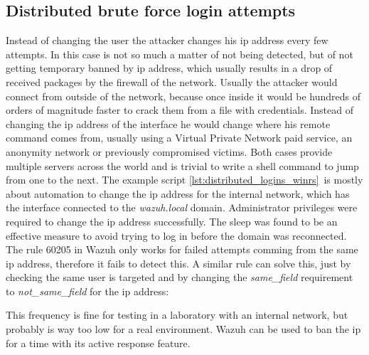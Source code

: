 \subsection{Distributed brute force login attempts}
Instead of changing the user the attacker changes his ip address every few attempts. In this case is not so much a matter of not being detected, but of not getting temporary banned by ip address, which usually results in a drop of received packages by the firewall of the network.
\linej
\linej
Usually the attacker would connect from outside of the network, because once inside it would be hundreds of orders of magnitude faster to crack them from a file with credentials.
Instead of changing the ip address of the interface he would change where his remote command comes from, usually using a Virtual Private Network paid service, an anonymity network or previously compromised victims.
Both cases provide multiple servers across the world and is trivial to write a shell command to jump from one to the next.
\linej
The example script \ref{lst:distributed_logins_winrs}\ is mostly about automation to change the ip address for the internal network, which has the interface connected to the \textit{wazuh.local} domain.
Administrator privileges were required to change the ip address successfully. The sleep was found to be an effective measure to avoid trying to log in before the domain was reconnected.
\linej
\linej
The rule 60205 in Wazuh only works for failed attempts comming from the same ip address, therefore it fails to detect this. A similar rule can solve this, just by checking the same user is targeted and by changing the \textit{same\_field} requirement to \textit{not\_same\_field} for the ip address:

\linej
This frequency is fine for testing in a laboratory with an internal network, but probably is way too low for a real environment.
Wazuh can be used to ban the ip for a time with its active response feature\cite{active_response}.

